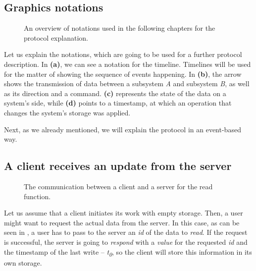 \subsection*{Graphics notations}

\begin{figure}[!htb]
    \centering
    \def\svgwidth{0.35\linewidth}
    \subfloat[]{{}}%
    \qquad
    \def\svgwidth{0.35\linewidth}
    \subfloat[]{{}}%
 \def\svgwidth{0.35\linewidth}
    \subfloat[]{{}}%
    \qquad
 \def\svgwidth{0.35\linewidth}
    \subfloat[]{{}}%
    \qquad
    \caption{An overview of notations used in the following chapters for the protocol explanation.}%
    \label{fig:notations}%
\end{figure}

Let us explain the notations, which are going to be used for a further protocol description. In  \textbf{(a)}, we can see a notation for the timeline. Timelines will be used for the matter of showing the sequence of events happening. In  \textbf{(b)}, the arrow shows the transmission of data between a subsystem \textit{A} and subsystem \textit{B}, as well as its direction and a command.  \textbf{(c)} represents the state of the data on a system's side, while  \textbf{(d)} points to a timestamp, at which an operation that changes the system's storage was applied.

Next, as we already mentioned, we will explain the protocol in an event-based way. 

\subsection*{A client receives an update from the server}

\begin{figure}[!htb]
    \begin{center}
    \def\svgwidth{\linewidth}
    
    \caption {The communication between a client and a server for the read function.}
    \label{fig:design2}
\end{center}
\end{figure}

Let us assume that a client initiates its work with empty storage. Then, a user might want to request the actual data from the server. In this case, as can be seen in , a user has to pass to the server an \textit{id} of the data to \textit{read}. If the request is successful, the server is going to \textit{respond} with a \textit{value} for the requested \textit{id} and the timestamp of the last write -- \textit{t\textsubscript{0}}, so the client will store this information in its own storage.

